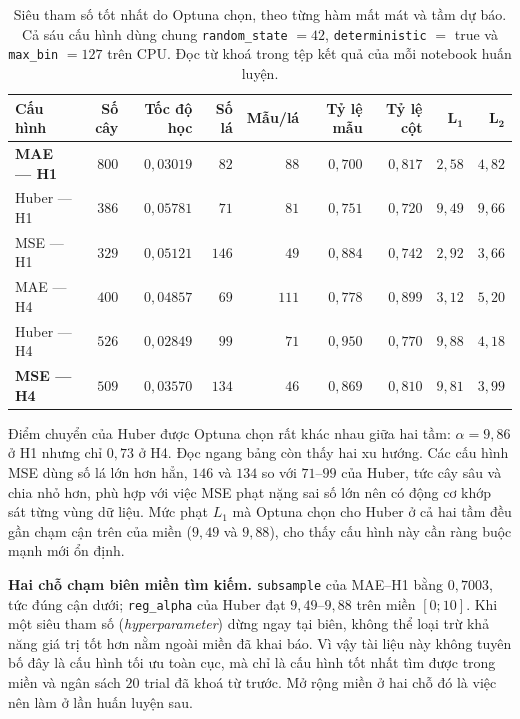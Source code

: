 \begin{table}[htbp]
\centering

\scriptsize
\begin{tabular}{l r r r r r r r r}
\toprule
\textbf{Cấu hình} & \textbf{Số cây} & \textbf{Tốc độ học} & \textbf{Số lá} &
\textbf{Mẫu/lá} & \textbf{Tỷ lệ mẫu} & \textbf{Tỷ lệ cột} & $\boldsymbol{L_1}$ & $\boldsymbol{L_2}$ \\
\midrule
\textbf{MAE --- H1}  & $800$ & $0{,}03019$ & $82$  & $88$ & $0{,}700$ & $0{,}817$ & $2{,}58$ & $4{,}82$ \\
Huber --- H1         & $386$ & $0{,}05781$ & $71$  & $81$ & $0{,}751$ & $0{,}720$ & $9{,}49$ & $9{,}66$ \\
MSE --- H1           & $329$ & $0{,}05121$ & $146$ & $49$ & $0{,}884$ & $0{,}742$ & $2{,}92$ & $3{,}66$ \\
\addlinespace
MAE --- H4           & $400$ & $0{,}04857$ & $69$  & $111$ & $0{,}778$ & $0{,}899$ & $3{,}12$ & $5{,}20$ \\
Huber --- H4         & $526$ & $0{,}02849$ & $99$  & $71$ & $0{,}950$ & $0{,}770$ & $9{,}88$ & $4{,}18$ \\
\textbf{MSE --- H4}  & $509$ & $0{,}03570$ & $134$ & $46$ & $0{,}869$ & $0{,}810$ & $9{,}81$ & $3{,}99$ \\
\bottomrule
\end{tabular}
\caption[Siêu tham số tốt nhất do Optuna chọn, theo từng hàm mất mát và tầm dự báo]{Siêu tham số tốt nhất do Optuna chọn, theo từng hàm mất mát và tầm dự báo. Cả sáu cấu
hình dùng chung \texttt{random\_state} $=42$, \texttt{deterministic} $=$ true và
\texttt{max\_bin} $=127$ trên CPU. Đọc từ khoá  trong tệp kết quả của mỗi
notebook huấn luyện.}
\label{tab:sieu_tham_so}
\end{table}

Điểm chuyển của Huber được Optuna chọn rất khác nhau giữa hai tầm: $\alpha = 9{,}86$ ở H1 nhưng
chỉ $0{,}73$ ở H4. Đọc ngang bảng còn thấy hai xu hướng. Các cấu hình MSE dùng số lá lớn hơn
hẳn, $146$ và $134$ so với $71$--$99$ của Huber, tức cây sâu và chia nhỏ hơn, phù hợp với
việc MSE phạt nặng sai số lớn nên có động cơ khớp sát từng vùng dữ liệu. Mức phạt $L_1$ mà
Optuna chọn cho Huber ở cả hai tầm đều gần chạm cận trên của miền ($9{,}49$ và $9{,}88$), cho
thấy cấu hình này cần ràng buộc mạnh mới ổn định.

\textbf{Hai chỗ chạm biên miền tìm kiếm.} \texttt{subsample} của MAE--H1 bằng $0{,}7003$, tức
đúng cận dưới; \texttt{reg\_alpha} của Huber đạt $9{,}49$--$9{,}88$ trên miền $[0;10]$. Khi một
siêu tham số (\textit{hyperparameter}) dừng ngay tại biên, không thể loại trừ khả năng giá trị tốt hơn nằm ngoài miền đã
khai báo. Vì vậy tài liệu này không tuyên bố đây là cấu hình tối ưu toàn cục, mà chỉ là cấu
hình tốt nhất tìm được trong miền và ngân sách $20$ trial đã khoá từ trước. Mở rộng miền ở hai
chỗ đó là việc nên làm ở lần huấn luyện sau.

